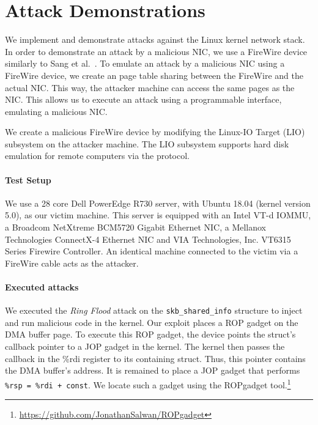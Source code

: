 \section{Attack Demonstrations}\label{Sec:setup}


We implement and demonstrate \compound attacks against the Linux kernel network stack. 
In order to demonstrate an attack by a malicious NIC, we use a FireWire device similarly to Sang et al.~\cite{SLND10}. To emulate an attack by a malicious NIC using a FireWire device, we create an \iova{} page table sharing between the FireWire and the actual NIC. This way, the attacker machine can access the same pages as the NIC. This allows us to execute an attack using a programmable interface, emulating a malicious NIC.


We create a malicious FireWire device by modifying the Linux-IO Target (LIO) subsystem on the attacker machine. The LIO subsystem supports hard disk emulation for remote computers via the \spb{} protocol. 

\paragraph{Test Setup}
We use a 28 core Dell PowerEdge R730 server, with Ubuntu 18.04 (kernel version 5.0), as our victim machine. This server is equipped with an Intel VT-d IOMMU, a Broadcom NetXtreme BCM5720 Gigabit Ethernet NIC, a Mellanox Technologies ConnectX-4 Ethernet NIC and VIA Technologies, Inc. VT6315 Series Firewire Controller. An identical machine connected to the victim via a FireWire cable acts as the attacker. 

\paragraph{Executed attacks}
We executed the \textit{Ring Flood} attack on the \texttt{skb\_shared\_info} structure to inject and run malicious code in the kernel.
Our exploit places a ROP gadget on the DMA buffer page. To execute this ROP gadget, the device points the struct's callback pointer to a JOP gadget in the kernel. The kernel then passes the callback in the \%rdi register to its containing struct. Thus, this pointer contains the DMA buffer's address. It is remained to place a JOP gadget that performs \texttt{\%rsp = \%rdi + const}. We locate such a gadget using the ROPgadget tool.\footnote{\url{https://github.com/JonathanSalwan/ROPgadget}}